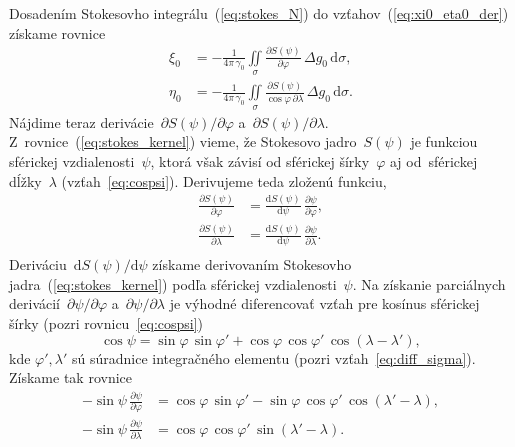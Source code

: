 \documentclass[a4paper, 12pt]{book}
\newcommand{\diff}{\mathrm d}
\begin{document}
Dosadením Stokesovho integrálu~(\ref{eq:stokes_N}) do 
vzťahov~(\ref{eq:xi0_eta0_der}) získame rovnice
%
\begin{equation}
\label{eq:vm}
\begin{split}
\xi_0 &= -\frac{1}{4\pi\,\gamma_0} \iint\limits_\sigma \frac{\partial 
S(\psi)}{\partial \varphi} \, \Delta g_0 \, \diff\sigma{,}\\
\eta_0 &= -\frac{1}{4\pi\,\gamma_0} \iint\limits_\sigma \frac{\partial 
S(\psi)}{\cos\varphi \, \partial \lambda} \, \Delta g_0 \, \diff\sigma{.}
\end{split}
\end{equation}
%
Nájdime teraz derivácie~$\partial S(\psi) \slash \partial\varphi$ a~$\partial 
S(\psi) \slash \partial\lambda$.  Z~rovnice~(\ref{eq:stokes_kernel}) vieme, že 
Stokesovo jadro~$S(\psi)$ je funkciou sférickej vzdialenosti~$\psi$, ktorá však 
závisí od sférickej šírky~$\varphi$ aj od~sférickej dĺžky~$\lambda$ 
(vzťah~\ref{eq:cospsi}).  Derivujeme teda zloženú funkciu,
%
\begin{equation}
\label{eq:stokes_kernel_partials}
\begin{split}
\frac{\partial S(\psi)}{\partial \varphi} &= \frac{\diff S(\psi)}{\diff \psi} 
\, \frac{\partial\psi}{\partial\varphi}{,}\\
%
\frac{\partial S(\psi)}{\partial \lambda} &= \frac{\diff S(\psi)}{\diff \psi} 
\, \frac{\partial\psi}{\partial\lambda}{.}\\
\end{split}
\end{equation}
%
Deriváciu~$\diff S(\psi) \slash \diff \psi$ získame derivovaním Stokesovho 
jadra~(\ref{eq:stokes_kernel}) podľa sférickej vzdialenosti~$\psi$.  Na 
získanie parciálnych derivácií~$\partial\psi \slash \partial\varphi$ 
a~$\partial\psi \slash \partial\lambda$ je výhodné diferencovať vzťah pre 
kosínus sférickej šírky (pozri rovnicu~\ref{eq:cospsi})
%
\begin{equation}
\cos\psi = \sin\varphi \, \sin\varphi' + \cos\varphi \, \cos\varphi' \,
\cos(\lambda - \lambda'){,}
\end{equation}
%
kde $\varphi', \lambda'$ sú súradnice integračného elementu (pozri 
vzťah~\ref{eq:diff_sigma}).  Získame tak rovnice
%
\begin{equation}
\label{eq:vm_aux}
\begin{split}
-\sin\psi \, \frac{\partial \psi}{\partial \varphi} &= \cos\varphi \, 
\sin\varphi' - \sin\varphi \, \cos\varphi' \, \cos(\lambda' - \lambda) {,}\\
-\sin\psi \, \frac{\partial \psi}{\partial \lambda} &= \cos\varphi \, 
\cos\varphi' \, \sin(\lambda' - \lambda){.}
\end{split}
\end{equation}
\end{document}
